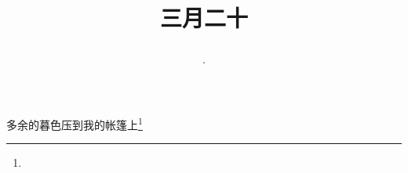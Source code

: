 \title{\date[d=28,m=4,y=2024][year:cn-y,年,month:cn,day:cn,日,·,weekday]·三月二十 }
多余的暮色压到我的帐篷上\footnote{ }

